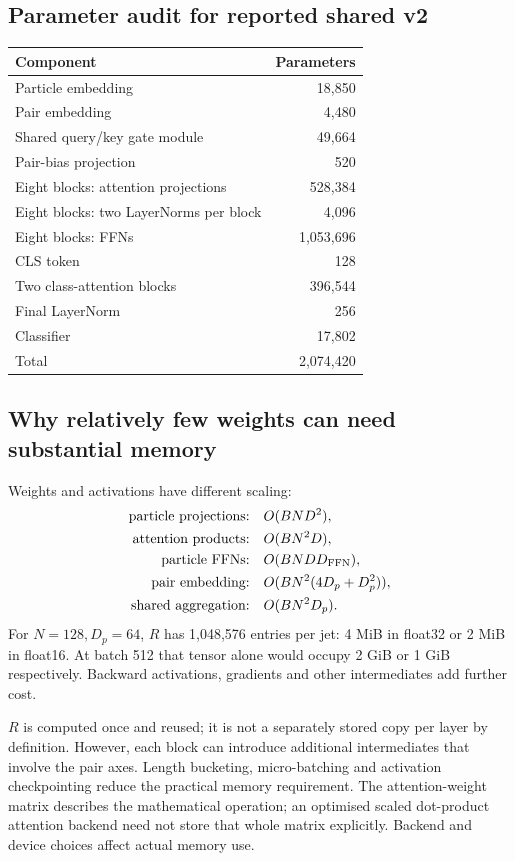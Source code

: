 \documentclass[11pt,a4paper]{article}
\numberwithin{equation}{section}
\begin{document}
\subsection{Parameter audit for reported shared v2}
\begin{center}
\begin{tabular}{lr}
\toprule Component & Parameters\\ \midrule
Particle embedding & 18,850\\
Pair embedding & 4,480\\
Shared query/key gate module & 49,664\\
Pair-bias projection & 520\\
Eight blocks: attention projections & 528,384\\
Eight blocks: two LayerNorms per block & 4,096\\
Eight blocks: FFNs & 1,053,696\\
CLS token & 128\\
Two class-attention blocks & 396,544\\
Final LayerNorm & 256\\
Classifier & 17,802\\ \midrule
Total & 2,074,420\\
\bottomrule
\end{tabular}
\end{center}

\subsection{Why relatively few weights can need substantial memory}
Weights and activations have different scaling:
\begin{align*}
 \text{particle projections:}&\quad O(BND^2),\\
 \text{attention products:}&\quad O(BN^2D),\\
 \text{particle FFNs:}&\quad O(BND D_{\rm FFN}),\\
 \text{pair embedding:}&\quad O(BN^2(4D_p+D_p^2)),\\
 \text{shared aggregation:}&\quad O(BN^2D_p).
\end{align*}
For $N=128,D_p=64$, $R$ has 1,048,576 entries per jet:
4 MiB in float32 or 2 MiB in float16.
At batch 512 that tensor alone would occupy 2 GiB or 1 GiB respectively.
Backward activations, gradients and other intermediates add further cost.

$R$ is computed once and reused; it is not a separately stored copy per
layer by definition. However, each block can introduce additional
intermediates that involve the pair axes.
Length bucketing, micro-batching and activation checkpointing reduce the
practical memory requirement.
The attention-weight matrix describes the mathematical operation; an
optimised scaled dot-product attention backend need not store that whole
matrix explicitly. Backend and device choices affect actual memory use.
\end{document}
